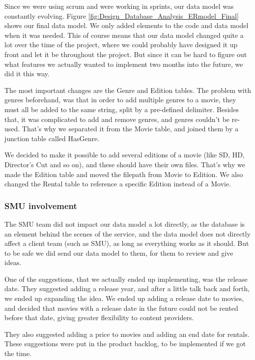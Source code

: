 Since we were using scrum and were working in sprints, our data model was constantly evolving. Figure \ref{fig:Design_Database_Analysis_ERmodel_Final} shows our final data model. We only added elements to the code and data model when it was needed. This of course means that our data model changed quite a lot over the time of the project, where we could probably have designed it up front and let it be throughout the project. But since it can be hard to figure out what features we actually wanted to implement two months into the future, we did it this way.

The most important changes are the Genre and Edition tables. The problem with genres beforehand, was that in order to add multiple genres to a movie, they must all be added to the same string, split by a pre-defined delimiter. Besides that, it was complicated to add and remove genres, and genres couldn't be re-used. That's why we separated it from the Movie table, and joined them by a junction table called HasGenre.

We decided to make it possible to add several editions of a movie (like SD, HD, Director's Cut and so on), and these should have their own files. That's why we made the Edition table and moved the filepath from Movie to Edition. We also changed the Rental table to reference a specific Edition instead of a Movie.

\subsubsection{SMU involvement}
\label{Design_Database_Analysis_SMU}

The SMU team did not impact our data model a lot directly, as the database is an element behind the scenes of the service, and the data model does not directly affect a client team (such as SMU), as long as everything works as it should. But to be safe we did send our data model to them, for them to review and give ideas.

One of the suggestions, that we actually ended up implementing, was the release date. They suggested adding a release year, and after a little talk back and forth, we ended up expanding the idea. We ended up adding a release date to movies, and decided that movies with a release date in the future could not be rented before that date, giving greater flexibility to content providers.

They also suggested adding a price to movies and adding an end date for rentals. These suggestions were put in the product backlog, to be implemented if we got the time.

